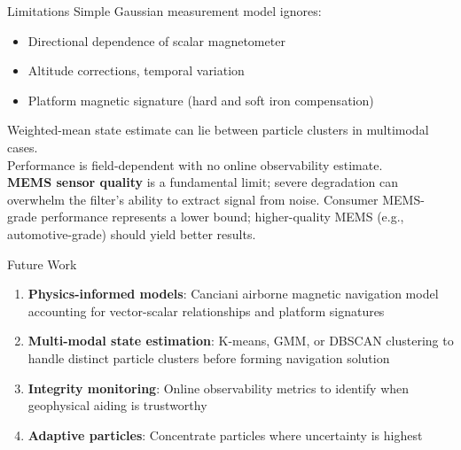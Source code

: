 \documentclass[aspectratio=169]{beamer}
\begin{document}
\begin{frame}{Limitations}
    Simple Gaussian measurement model ignores:
        \begin{itemize}
            \item Directional dependence of scalar magnetometer
            \item Altitude corrections, temporal variation
            \item Platform magnetic signature (hard and soft iron compensation)
        \end{itemize}
    \vspace{1em}
    Weighted-mean state estimate can lie between particle clusters in multimodal cases.\\
    \vspace{1em}
    Performance is field-dependent with no online observability estimate.\\
    \vspace{1em}
    \textbf{MEMS sensor quality} is a fundamental limit; severe degradation can overwhelm the filter's ability to extract signal from noise. Consumer MEMS-grade performance represents a lower bound; higher-quality MEMS (e.g., automotive-grade) should yield better results.
\end{frame}
\begin{frame}{Future Work}
\begin{enumerate}
    \item \textbf{Physics-informed models}: Canciani airborne magnetic navigation model accounting for vector-scalar relationships and platform signatures
    \item \textbf{Multi-modal state estimation}: K-means, GMM, or DBSCAN clustering to handle distinct particle clusters before forming navigation solution
    \item \textbf{Integrity monitoring}: Online observability metrics to identify when geophysical aiding is trustworthy
    \item \textbf{Adaptive particles}: Concentrate particles where uncertainty is highest
\end{enumerate}
\end{frame}
\end{document}
